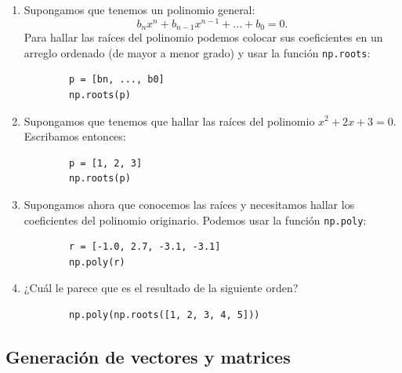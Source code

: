 \begin{enumerate}
	\item Supongamos que tenemos un polinomio general:
	\begin{equation}
		b_{n}x^{n}+b_{n-1}x^{n-1}+...+b_{0}=0.
	\end{equation}
	Para hallar las raíces del polinomio podemos colocar sus coeficientes en un arreglo ordenado (de mayor a menor grado) y usar la función \texttt{np.roots}:
	\begin{verbatim}
		p = [bn, ..., b0]
		np.roots(p)
	\end{verbatim}
	
	\item Supongamos que tenemos que hallar las raíces del polinomio $x^{2}+2x+3=0$. Escribamos entonces:
	\begin{verbatim}
		p = [1, 2, 3]
		np.roots(p)
	\end{verbatim}
	
	\item Supongamos ahora que conocemos las raíces y necesitamos hallar los coeficientes del polinomio originario. Podemos usar la función \texttt{np.poly}:
	\begin{verbatim}
		r = [-1.0, 2.7, -3.1, -3.1]
		np.poly(r)
	\end{verbatim}
	
	\item ¿Cuál le parece que es el resultado de la siguiente orden?
	\begin{verbatim}
		np.poly(np.roots([1, 2, 3, 4, 5]))
	\end{verbatim}
	
\end{enumerate}

\subsection{Generación de vectores y matrices}

